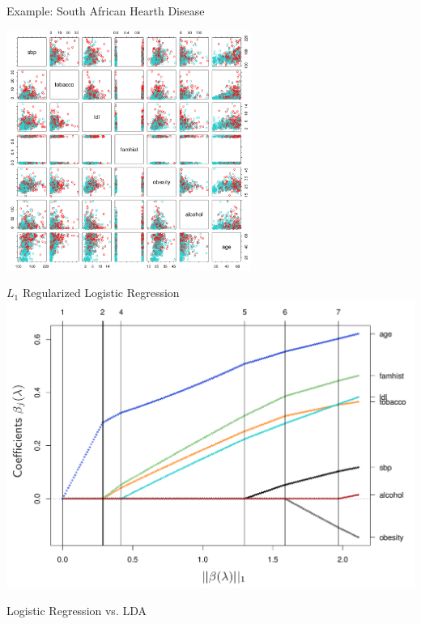 \documentclass{beamer}
\begin{document}
\begin{frame}{Example: South African Hearth Disease}
\begin{center}
\includegraphics[width=0.6\textwidth]{scatter.png}
\end{center}
\end{frame}


\begin{frame}{$L_1$ Regularized Logistic Regression}
\includegraphics[width=\textwidth]{L1.png}
\end{frame}

\begin{frame}{Logistic Regression vs. LDA}

\end{frame}
\end{document}
